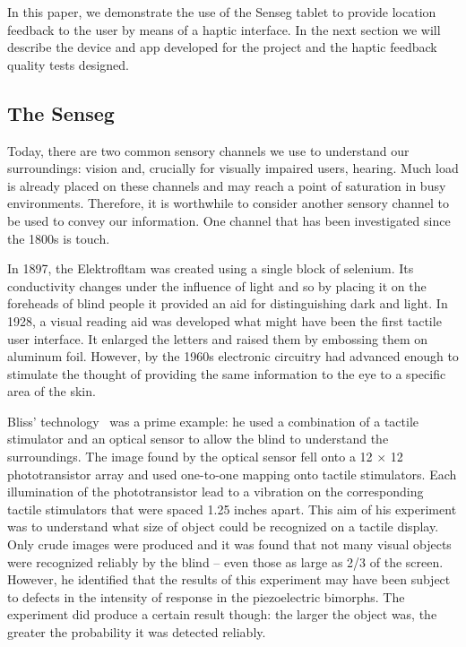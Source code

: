 In this paper, we demonstrate the use of the Senseg tablet to provide location feedback to the user by means of a haptic interface. In the next section we will describe the device and app developed for the project and the haptic feedback quality tests designed.

\subsection{The Senseg}
Today, there are two common sensory channels we use to understand our surroundings: vision and, crucially for visually impaired users, hearing. Much load is already placed on these channels  and may reach a point of saturation in busy environments. Therefore, it is worthwhile to consider another sensory channel to be used to convey our information. One channel that has been investigated since the 1800s is touch. 

In 1897, the Elektrofltam was created using a single block of selenium.  Its conductivity changes under the influence of light and so by placing it on the foreheads of blind people  it provided an aid for distinguishing dark and light. In 1928, a visual reading aid was developed  what might have been the first tactile user interface. It enlarged the letters and raised them by embossing them on aluminum foil. However, by the 1960s electronic circuitry had advanced enough to stimulate the thought of providing the same information to the eye to a specific area of the skin.  

Bliss' technology~\citep{bliss1970optical} was a prime example: he used a combination of a tactile stimulator and an optical sensor to allow the blind to understand the surroundings. The image found by the optical sensor fell onto a 12 $\times$ 12 phototransistor array and used one-to-one mapping onto tactile stimulators. Each illumination of the phototransistor lead to a vibration on the corresponding tactile stimulators that were spaced 1.25 inches apart. This aim of his experiment was to understand what size of object could be recognized on a tactile display.  Only crude images were produced and it was found that not many visual objects were recognized reliably by the blind -- even those as large as 2/3 of the screen.  However, he identified that the results of this experiment may have been subject to defects in the intensity of response in the piezoelectric bimorphs.  The experiment did produce a certain result though: the larger the object was, the greater the probability it was detected reliably.  

